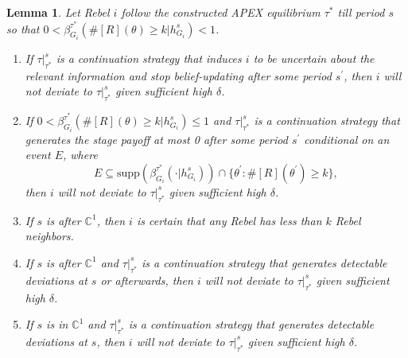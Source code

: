 \documentclass[12pt,letter]{article}
\newcommand{\Kappa}{\mathbb{C}}
\newtheorem{lemma}{Lemma}[section]
\theoremstyle{definition}
\theoremstyle{definition}
\theoremstyle{remark}
\theoremstyle{claim}
\begin{document}
\begin{lemma}
\label{lemma:uncertain}
Let Rebel $i$ follow the constructed APEX equilibrium $\tau^{*}$ till period $s$ so that $0<\beta^{\tau^{*}}_{G_i}(\#[R](\theta)\geq k|h^s_{G_i})<1$.
\begin{enumerate}[label=(\arabic*)]
\item If $\tau|^s_{\tau^{*}}$ is a continuation strategy that induces $i$ to be uncertain about the relevant information and stop belief-updating after some period $s^{'}$, then $i$ will not deviate to $\tau|^s_{\tau^{*}}$ given sufficient high $\delta$.
\item If $0<\beta^{\tau^{*}}_{G_i}(\#[R](\theta)\geq k|h^s_{G_i})\leq1$ and $\tau|^s_{\tau^{*}}$ is a continuation strategy that generates the stage payoff at most 0 after some period $s^{'}$ conditional on an event $E$, where 
\[E\subseteq \mathrm{supp}(\beta^{\tau^{*}}_{G_i}(\cdot |h^s_{G_i}))\cap\{\theta^{'}:\#[R](\theta^{'})\geq k\},\] 
then $i$ will not deviate to $\tau|^s_{\tau^{*}}$ given sufficient high $\delta$.
\item If $s$ is after $\Kappa^1$, then $i$ is certain that any Rebel has less than $k$ Rebel neighbors.
\item If $s$ is after $\Kappa^1$ and $\tau|^s_{\tau^{*}}$ is a continuation strategy that generates detectable deviations at $s$ or afterwards, then $i$ will not deviate to $\tau|^s_{\tau^{*}}$ given sufficient high $\delta$.
\item If $s$ is in $\Kappa^1$ and $\tau|^s_{\tau^{*}}$ is a continuation strategy that generates detectable deviations at $s$, then $i$ will not deviate to $\tau|^s_{\tau^{*}}$ given sufficient high $\delta$.
\end{enumerate}

\end{lemma}
\end{document}
